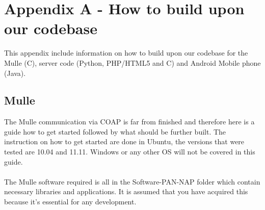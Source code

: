

\section{Appendix A - How to build upon our codebase}
This appendix include information on how to build upon our codebase for the Mulle (C), server code (Python, PHP/HTML5 and C) and Android Mobile phone (Java).
\subsection{Mulle}
The Mulle communication via COAP is far from finished and therefore here is a guide how to get started followed by what should be further built. The instruction on how to get started are done in Ubuntu, the versions that were tested are 10.04 and 11.11. Windows or any other OS will not be covered in this guide.
\\\\
The Mulle software required is all in the Software-PAN-NAP folder which contain necessary libraries and applications. It is assumed that you have acquired this because it's essential for any development.

